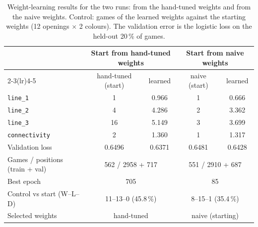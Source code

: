 \documentclass[a4paper,10pt,twocolumn]{article}
\newcommand{\code}[1]{\texttt{#1}}
\begin{document}
\begin{table}[h]
\centering
\caption{Weight-learning results for the two runs: from the hand-tuned weights and from the naive weights. Control: games of the learned weights against the starting weights (12 openings $\times$ 2 colours). The validation error is the logistic loss on the held-out 20\,\% of games.}
\label{tab:learning}
\begin{tabular}{@{}lcccc@{}}
\toprule
& \multicolumn{2}{c}{Start from hand-tuned weights} & \multicolumn{2}{c}{Start from naive weights} \\
\cmidrule(lr){2-3}\cmidrule(lr){4-5}
& hand-tuned (start) & learned & naive (start) & learned \\
\midrule
\code{line\_1} & 1 & 0.966 & 1 & 0.666 \\
\code{line\_2} & 4 & 4.286 & 2 & 3.362 \\
\code{line\_3} & 16 & 5.149 & 3 & 3.699 \\
\code{connectivity} & 2 & 1.360 & 1 & 1.317 \\
\midrule
Validation loss & 0.6496 & 0.6371 & 0.6481 & 0.6428 \\
Games / positions (train + val) & \multicolumn{2}{c}{562 / 2958 + 717} & \multicolumn{2}{c}{551 / 2910 + 687} \\
Best epoch & \multicolumn{2}{c}{705} & \multicolumn{2}{c}{85} \\
Control vs start (W--L--D) & \multicolumn{2}{c}{11--13--0 (45.8\,\%)} & \multicolumn{2}{c}{8--15--1 (35.4\,\%)} \\
Selected weights & \multicolumn{2}{c}{hand-tuned} & \multicolumn{2}{c}{naive (starting)} \\
\bottomrule
\end{tabular}
\end{table}
\end{document}
